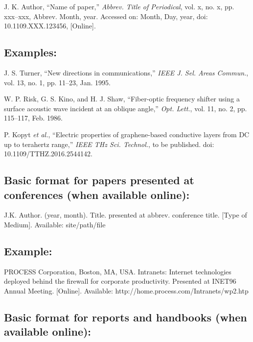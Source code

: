 \documentclass[journal]{IEEEtran}
\begin{document}
J. K. Author, ``Name of paper,'' {\em Abbrev. Title of Periodical}, vol. x, no. x, pp. xxx--xxx, Abbrev. Month, year. Accessed on: Month, Day, year, doi: 10.1109.XXX.123456, [Online].

\subsection*{Examples:}

\begin{thebibliography}{34}
\setcounter{enumiv}{13}

\bibitem{}J. S. Turner, ``New directions in communications,'' {\em IEEE J. Sel. Areas Commun.}, vol. 13, no. 1, pp. 11--23, Jan. 1995. 

\bibitem{} W. P. Risk, G. S. Kino, and H. J. Shaw, ``Fiber-optic frequency shifter using a surface acoustic wave incident at an oblique angle,'' {\em Opt. Lett.}, vol. 11, no. 2, pp. 115--117, Feb. 1986.

\bibitem{} P. Kopyt {\em et al.}, ``Electric properties of graphene-based conductive layers from DC up to terahertz range,'' {\em IEEE THz Sci. Technol.}, to be published. doi: 10.1109/TTHZ.2016.2544142.
\end{thebibliography}

\subsection*{Basic format for papers presented at conferences (when available online):}

J.K. Author. (year, month). Title. presented at abbrev. conference title. [Type of Medium]. Available: site/path/file

\subsection*{Example:}

\begin{thebibliography}{34}
\setcounter{enumiv}{16}

\bibitem{}PROCESS Corporation, Boston, MA, USA. Intranets: Internet technologies deployed behind the firewall for corporate productivity. Presented at INET96 Annual Meeting. [Online]. Available: http://home.process.com/Intranets/wp2.htp
\end{thebibliography}

\subsection*{Basic format for reports  and  handbooks (when available online):}
  
\end{document}
